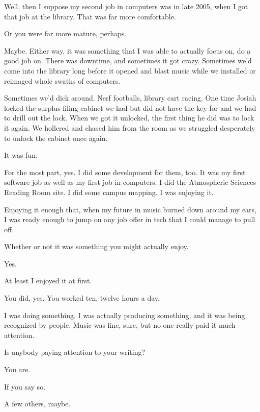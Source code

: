 \noindent Well, then I suppose my second job in computers was in late 2005, when I got that job at the library. That was far more comfortable.

\begin{ally}
Or you were far more mature, perhaps.
\end{ally}
Maybe. Either way, it was something that I was able to actually focus on, do a good job on. There was downtime, and sometimes it got crazy. Sometimes we'd come into the library long before it opened and blast music while we installed or reimaged whole swaths of computers.

Sometimes we'd dick around. Nerf footballs, library cart racing. One time Josiah locked the surplus filing cabinet we had but did not have the key for and we had to drill out the lock. When we got it unlocked, the first thing he did was to lock it again. We hollered and chased him from the room as we struggled desperately to unlock the cabinet once again.

\begin{ally}
It was fun.
\end{ally}
For the most part, yes. I did some development for them, too. It was my first software job as well as my first job in computers. I did the Atmospheric Sciences Reading Room site. I did some campus mapping. I was enjoying it.

Enjoying it enough that, when my future in music burned down around my ears, I was ready enough to jump on any job offer in tech that I could manage to pull off.

\begin{ally}
Whether or not it was something you might actually enjoy.
\end{ally}
Yes.
\newpage

\noindent At least I enjoyed it at first.

\begin{ally}
You did, yes. You worked ten, twelve hours a day.
\end{ally}
I was doing something. I was actually producing something, and it was being recognized by people. Music was fine, sure, but no one really paid it much attention.

\begin{ally}
Is anybody paying attention to your writing?
\end{ally}
You are.

\begin{ally}
If you say so.
\end{ally}
A few others, maybe.

